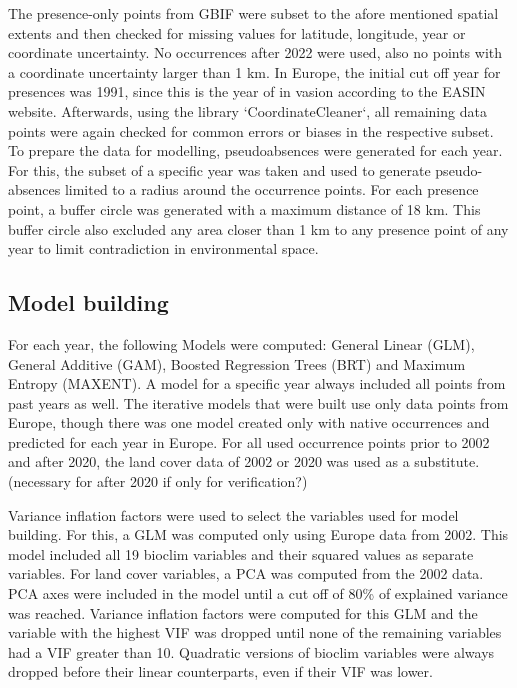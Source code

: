\documentclass[12pt]{article}
\begin{document}
The presence-only points from GBIF were subset to the afore mentioned spatial extents and then checked for missing values for latitude, longitude, year or coordinate uncertainty. 
No occurrences after 2022 were used, also no points with a coordinate uncertainty larger than 1 km. 
In Europe, the initial cut off year for presences was 1991, since this is the year of in vasion according to the EASIN website.
Afterwards, using the library `CoordinateCleaner`, all remaining data points were again checked for common errors or biases in the respective subset.
To prepare the data for modelling, pseudoabsences were generated for each year. 
For this, the subset of a specific year was taken and used to generate pseudo-absences limited to a radius around the occurrence points.
For each presence point, a buffer circle was generated with a maximum distance of 18 km. This buffer circle also excluded any area closer than 1 km to any presence point of any year to limit contradiction in environmental space.

\subsection{Model building}
For each year, the following Models were computed: General Linear (GLM), General Additive (GAM), Boosted Regression Trees (BRT) and Maximum Entropy (MAXENT).  
A model for a specific year always included all points from past years as well.
The iterative models that were built use only data points from Europe, though there was one model created only with native occurrences and predicted for each year in Europe.
For all used occurrence points prior to 2002 and after 2020, the land cover data of 2002 or 2020 was used as a substitute.
(necessary for after 2020 if only for verification?)

Variance inflation factors were used to select the variables used for model building. 
For this, a GLM was computed only using Europe data from 2002.
This model included all 19 bioclim variables and their squared values as separate variables.
For land cover variables, a PCA was computed from the 2002 data.
PCA axes were included in the model until a cut off of 80\% of explained variance was reached.
Variance inflation factors were computed for this GLM and the variable with the highest VIF was dropped until none of the remaining variables had a VIF greater than 10. Quadratic versions of bioclim variables were always dropped before their linear counterparts, even if their VIF was lower.
\end{document}
